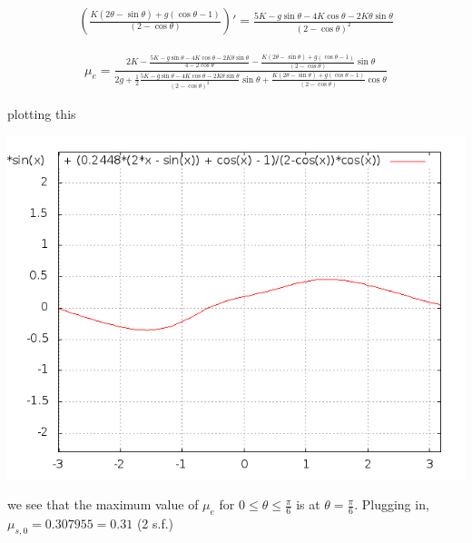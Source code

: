 \documentclass{article}
\newcommand{\half}{\frac{1}{2}}
\begin{document}
\begin{align*}
\left(\frac{K(2\theta - \sin\theta)+ g(\cos\theta - 1)}{(2 - \cos\theta)}\right)' = \frac{5K - g\sin\theta - 4K\cos\theta - 2K\theta\sin\theta}{(2-\cos\theta)^2}
\end{align*}

\begin{align*}
\mu_{e} = \frac{2K - \frac{5K - g\sin\theta - 4K\cos\theta - 2K\theta\sin\theta}{4-2\cos\theta} - \frac{K(2\theta - \sin\theta)+ g(\cos\theta - 1)}{(2 - \cos\theta)}\sin\theta}{2g + \half  \frac{5K - g\sin\theta - 4K\cos\theta - 2K\theta\sin\theta}{(2-\cos\theta)^2}\sin\theta + \frac{K(2\theta - \sin\theta)+ g(\cos\theta - 1)}{(2 - \cos\theta)}\cos\theta}
\end{align*}

plotting this

\includegraphics[width=\textwidth]{mu.png}

we see that the maximum value of $\mu_e$ for $0 \le \theta \le \frac{\pi}{6}$ is at $\theta = \frac{\pi}{6}$. Plugging in, $\mu_{s,0} = 0.307955 = 0.31$ (2 s.f.)
\end{document}
